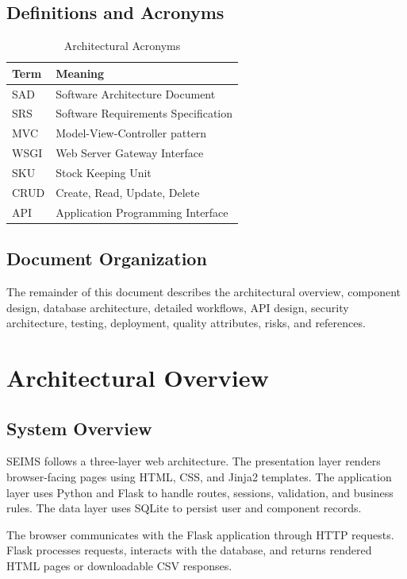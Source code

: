 \documentclass[conference]{IEEEtran}
\begin{document}
\subsection{Definitions and Acronyms}

\begin{table}[!t]
\caption{Architectural Acronyms}
\label{tab:acronyms}
\centering
\small
\begin{tabularx}{\columnwidth}{lY}
\toprule
\textbf{Term} & \textbf{Meaning}\\
\midrule
SAD & Software Architecture Document\\
SRS & Software Requirements Specification\\
MVC & Model-View-Controller pattern\\
WSGI & Web Server Gateway Interface\\
SKU & Stock Keeping Unit\\
CRUD & Create, Read, Update, Delete\\
API & Application Programming Interface\\
\bottomrule
\end{tabularx}
\end{table}

\subsection{Document Organization}
The remainder of this document describes the architectural overview, component design, database architecture, detailed workflows, API design, security architecture, testing, deployment, quality attributes, risks, and references.

\section{Architectural Overview}

\subsection{System Overview}
SEIMS follows a three-layer web architecture. The presentation layer renders browser-facing pages using HTML, CSS, and Jinja2 templates. The application layer uses Python and Flask to handle routes, sessions, validation, and business rules. The data layer uses SQLite to persist user and component records.

The browser communicates with the Flask application through HTTP requests. Flask processes requests, interacts with the database, and returns rendered HTML pages or downloadable CSV responses.
\end{document}
